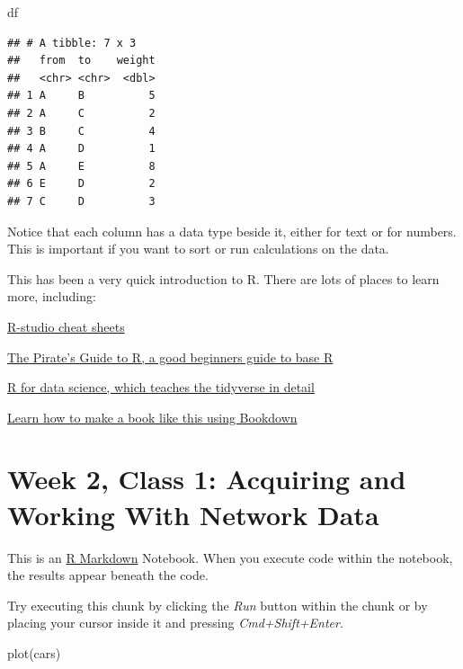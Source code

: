\documentclass[
]{book}
\newenvironment{Shaded}{\begin{snugshade}}{\end{snugshade}}
\newcommand{\FunctionTok}[1]{\textcolor[rgb]{0.00,0.00,0.00}{#1}}
\newcommand{\NormalTok}[1]{#1}
\begin{document}
\begin{Shaded}
\begin{Highlighting}[]
\NormalTok{df}
\end{Highlighting}
\end{Shaded}

\begin{verbatim}
## # A tibble: 7 x 3
##   from  to    weight
##   <chr> <chr>  <dbl>
## 1 A     B          5
## 2 A     C          2
## 3 B     C          4
## 4 A     D          1
## 5 A     E          8
## 6 E     D          2
## 7 C     D          3
\end{verbatim}

Notice that each column has a data type beside it, either for text or for numbers. This is important if you want to sort or run calculations on the data.

This has been a very quick introduction to R. There are lots of places to learn more, including:

\href{https://www.rstudio.com/resources/cheatsheets/}{R-studio cheat sheets}

\href{https://bookdown.org/ndphillips/YaRrr/}{The Pirate's Guide to R, a good beginners guide to base R}

\href{https://r4ds.had.co.nz}{R for data science, which teaches the tidyverse in detail}

\href{https://bookdown.org/yihui/bookdown/introduction.html}{Learn how to make a book like this using Bookdown}

\hypertarget{week-2-class-1-acquiring-and-working-with-network-data}{%
\chapter{Week 2, Class 1: Acquiring and Working With Network Data}\label{week-2-class-1-acquiring-and-working-with-network-data}}

This is an \href{http://rmarkdown.rstudio.com}{R Markdown} Notebook. When you execute code within the notebook, the results appear beneath the code.

Try executing this chunk by clicking the \emph{Run} button within the chunk or by placing your cursor inside it and pressing \emph{Cmd+Shift+Enter}.

\begin{Shaded}
\begin{Highlighting}[]
\FunctionTok{plot}\NormalTok{(cars)}
\end{Highlighting}
\end{Shaded}
\end{document}
